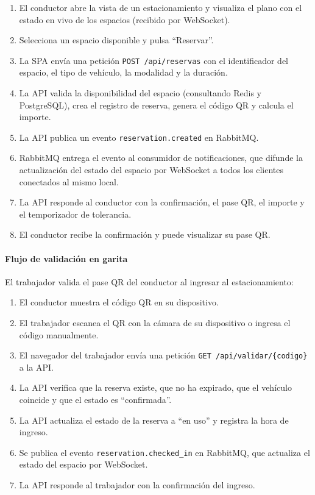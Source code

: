 \begin{enumerate}
    \item El conductor abre la vista de un estacionamiento y visualiza el plano con el estado en vivo de los espacios (recibido por WebSocket).
    \item Selecciona un espacio disponible y pulsa ``Reservar''.
    \item La SPA envía una petición \texttt{POST /api/reservas} con el identificador del espacio, el tipo de vehículo, la modalidad y la duración.
    \item La API valida la disponibilidad del espacio (consultando Redis y PostgreSQL), crea el registro de reserva, genera el código QR y calcula el importe.
    \item La API publica un evento \texttt{reservation.created} en RabbitMQ.
    \item RabbitMQ entrega el evento al consumidor de notificaciones, que difunde la actualización del estado del espacio por WebSocket a todos los clientes conectados al mismo local.
    \item La API responde al conductor con la confirmación, el pase QR, el importe y el temporizador de tolerancia.
    \item El conductor recibe la confirmación y puede visualizar su pase QR.
\end{enumerate}

\paragraph{Flujo de validación en garita} El trabajador valida el pase QR del conductor al ingresar al estacionamiento:

\begin{enumerate}
    \item El conductor muestra el código QR en su dispositivo.
    \item El trabajador escanea el QR con la cámara de su dispositivo o ingresa el código manualmente.
    \item El navegador del trabajador envía una petición \texttt{GET /api/validar/\{codigo\}} a la API.
    \item La API verifica que la reserva existe, que no ha expirado, que el vehículo coincide y que el estado es ``confirmada''.
    \item La API actualiza el estado de la reserva a ``en uso'' y registra la hora de ingreso.
    \item Se publica el evento \texttt{reservation.checked\_in} en RabbitMQ, que actualiza el estado del espacio por WebSocket.
    \item La API responde al trabajador con la confirmación del ingreso.
\end{enumerate}

